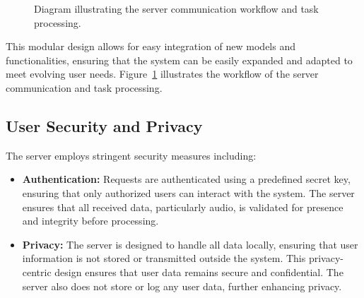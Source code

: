 \documentclass[12pt]{article}
\begin{document}
\begin{figure}[bht]
	\begin{center}
	{}
	\end{center}
	\vspace{-5mm} %
\caption{Diagram illustrating the server communication workflow and task processing.}
	\label{server}
\end{figure}
This modular design allows for easy integration of new models and functionalities, ensuring that the system can be easily expanded and adapted to meet evolving user needs. Figure~\ref{server} illustrates the workflow of the server communication and task processing.

\subsection{User Security and Privacy}
The server employs stringent security measures including:
\begin{itemize}
	\item \textbf{Authentication:} Requests are authenticated using a predefined secret key, ensuring that only authorized users can interact with the system. The server ensures that all received data, particularly audio, is validated for presence and integrity before processing. 
	\item \textbf{Privacy:} The server is designed to handle all data locally, ensuring that user information is not stored or transmitted outside the system. This privacy-centric design ensures that user data remains secure and confidential. The server also does not store or log any user data, further enhancing privacy.
\end{itemize}
\end{document}
